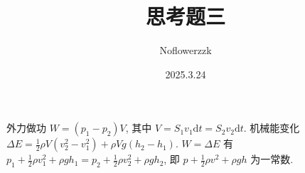 \documentclass{article}
\title{思考题三}
\author{Noflowerzzk}
\date{2025.3.24}
\newcommand{\dd}{\mathrm{d}}
\begin{document}
\maketitle

外力做功 $W = (p_1 - p_2)V$, 其中 $V = S_1v_1\dd t = S_2v_2\dd t$. 机械能变化 $\Delta E = \frac{1}{2}\rho V(v_2^2 - v_1^2) + \rho V g(h_2 - h_1)$. $W = \Delta E$ 有 $p_1 + \frac{1}{2}\rho v_1^2 + \rho gh_1 = p_2 + \frac{1}{2}\rho v_2^2 + \rho gh_2$, 即 $p + \frac{1}{2}\rho v^2 + \rho gh$ 为一常数.
\end{document}
